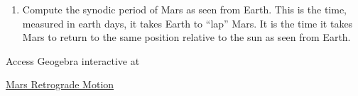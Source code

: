 \documentclass{ximera}
\begin{document}
\begin{exploration}
\begin{enumerate}
\item Compute the synodic period of Mars as seen from Earth. This is the time, measured in earth days, it takes Earth to ``lap'' Mars. It is the time it takes Mars to return to the same position relative to the sun as seen from Earth. 



\end{enumerate}

Access Geogebra interactive at
 
\href{https://www.geogebra.org/classic/addm38j6}{Mars Retrograde Motion}

 
\begin{onlineOnly}
    \begin{center}
\end{center}
\end{onlineOnly}



\end{exploration}
\end{document}
